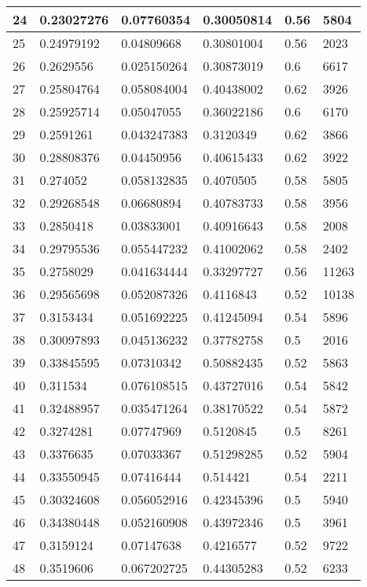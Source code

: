 \begin{longtable}{|l|l|l|l|l|l|}
24 & 0.23027276 & 0.07760354 & 0.30050814 & 0.56 & 5804 \\ \hline 
25 & 0.24979192 & 0.04809668 & 0.30801004 & 0.56 & 2023 \\ \hline 
26 & 0.2629556 & 0.025150264 & 0.30873019 & 0.6 & 6617 \\ \hline 
27 & 0.25804764 & 0.058084004 & 0.40438002 & 0.62 & 3926 \\ \hline 
28 & 0.25925714 & 0.05047055 & 0.36022186 & 0.6 & 6170 \\ \hline 
29 & 0.2591261 & 0.043247383 & 0.3120349 & 0.62 & 3866 \\ \hline 
30 & 0.28808376 & 0.04450956 & 0.40615433 & 0.62 & 3922 \\ \hline 
31 & 0.274052 & 0.058132835 & 0.4070505 & 0.58 & 5805 \\ \hline 
32 & 0.29268548 & 0.06680894 & 0.40783733 & 0.58 & 3956 \\ \hline 
33 & 0.2850418 & 0.03833001 & 0.40916643 & 0.58 & 2008 \\ \hline 
34 & 0.29795536 & 0.055447232 & 0.41002062 & 0.58 & 2402 \\ \hline 
35 & 0.2758029 & 0.041634444 & 0.33297727 & 0.56 & 11263 \\ \hline 
36 & 0.29565698 & 0.052087326 & 0.4116843 & 0.52 & 10138 \\ \hline 
37 & 0.3153434 & 0.051692225 & 0.41245094 & 0.54 & 5896 \\ \hline 
38 & 0.30097893 & 0.045136232 & 0.37782758 & 0.5 & 2016 \\ \hline 
39 & 0.33845595 & 0.07310342 & 0.50882435 & 0.52 & 5863 \\ \hline 
40 & 0.311534 & 0.076108515 & 0.43727016 & 0.54 & 5842 \\ \hline 
41 & 0.32488957 & 0.035471264 & 0.38170522 & 0.54 & 5872 \\ \hline 
42 & 0.3274281 & 0.07747969 & 0.5120845 & 0.5 & 8261 \\ \hline 
43 & 0.3376635 & 0.07033367 & 0.51298285 & 0.52 & 5904 \\ \hline 
44 & 0.33550945 & 0.07416444 & 0.514421 & 0.54 & 2211 \\ \hline 
45 & 0.30324608 & 0.056052916 & 0.42345396 & 0.5 & 5940 \\ \hline 
46 & 0.34380448 & 0.052160908 & 0.43972346 & 0.5 & 3961 \\ \hline 
47 & 0.3159124 & 0.07147638 & 0.4216577 & 0.52 & 9722 \\ \hline 
48 & 0.3519606 & 0.067202725 & 0.44305283 & 0.52 & 6233 \\ \hline 

\end{longtable}
